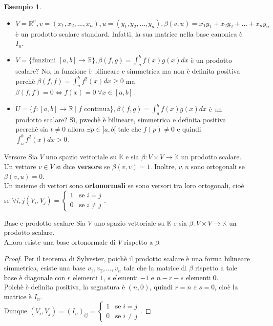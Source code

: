 \documentclass[a4paper]{article}
\theoremstyle{definition}
\newtheorem*{es}{Esempio}
\begin{document}
	\begin{es}
		\begin{itemize}
			\item $V = \mathbb{R}^n, v = (x_1, x_2, ..., x_n), u = (y_1, y_2, ..., y_n), \beta(v, u) = x_1y_1 + x_2y_2 + ... + x_ny_n$ è un prodotto scalare standard.
			Infatti, la sua matrice nella base canonica è $I_n$.
			\item $V = \{\text{funzioni } [a, b] \to \mathbb{R}\}, \beta(f, g) = \int_a^b f(x)g(x)dx$ è un prodotto scalare?
			No, la funzione è bilineare e simmetrica ma non è definita positiva perchè $\beta(f, f) = \int_a^b f^2(x)dx \ge 0$ ma $\beta(f, f) = 0 \Leftrightarrow f(x) = 0 \ \forall x \in [a, b]$.
			\item $U = \{f: [a, b] \to \mathbb{R} \mid f \text{ continua}\}, \beta(f, g) = \int_a^b f(x)g(x)dx$ è un prodotto scalare?
			Sì, pwechè è bilineare, simmetrica e definita positiva peerchè sia $t \ne 0$ allora $\exists p \in ]a, b[$ tale che $f(p) \ne 0$ e quindi $\int_a^b f^2(x)dx > 0$.
		\end{itemize}
	\end{es}

	\begin{deff}{Versore}{}
		Sia $V$ uno spazio vettoriale su $\mathbb{K}$ e sia $\beta: V \times V \to \mathbb{K}$ un prodotto scalare. \\
		Un vettore $v \in V$ si dice \textbf{versore} se $\beta(v, v) = 1$.
		Inoltre, $v, u$ sono ortogonali se $\beta(v, u) = 0$. \\
		Un insieme di vettori sono \textbf{ortonormali} se sono versori tra loro ortogonali, cioè se $\forall i, j (V_i, V_j) = \begin{cases}
			1 & \text{se } i = j \\
			0 & \text{se } i \ne j
		\end{cases}$.
	\end{deff}

	\begin{teo}{Base e prodotto scalare}{}
		Sia $V$ uno spazio vettoriale su $\mathbb{K}$ e sia $\beta: V \times V \to \mathbb{K}$ un prodotto scalare. \\
		Allora esiste una base ortonormale di $V$ rispetto a $\beta$.
	\end{teo}
	\begin{proof}
		Per il teorema di Sylvester, poichè il prodotto scalare è una forma bilineare simmetrica,
		esiste una base $v_1, v_2, ..., v_n$ tale che la matrice di $\beta$ rispetto a tale base è diagonale con $r$ elementi $1$, $s$ elementi $-1$ e $n - r - s$ elementi $0$. \\
		Poichè è definita positiva, la segnatura è $(n, 0)$, quindi $r = n$ e $s = 0$, cioè la matrice è $I_n$. \\
		Dunque $(V_i, V_j) = (I_n)_{ij} = \begin{cases}
			1 & \text{se } i = j \\
			0 & \text{se } i \ne j
		\end{cases}$.
	\end{proof}
\end{document}
